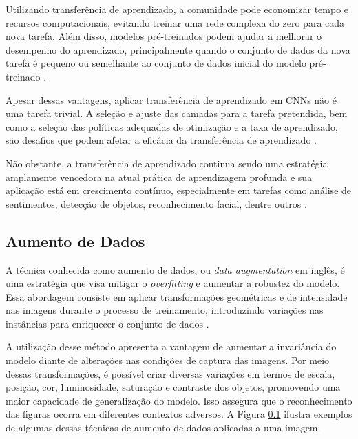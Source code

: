 Utilizando transferência de aprendizado, a comunidade pode economizar tempo e recursos computacionais, evitando treinar uma rede complexa do zero para cada nova tarefa. Além disso, modelos pré-treinados podem ajudar a melhorar o desempenho do aprendizado, principalmente quando o conjunto de dados da nova tarefa é pequeno ou semelhante ao conjunto de dados inicial do modelo pré-treinado \citep{Pan2010}.

Apesar dessas vantagens, aplicar transferência de aprendizado em CNNs não é uma tarefa trivial. A seleção e ajuste das camadas para a tarefa pretendida, bem como a seleção das políticas adequadas de otimização e a taxa de aprendizado, são desafios que podem afetar a eficácia da transferência de aprendizado \citep{Yosinski2014HowNetworks}.

Não obstante, a transferência de aprendizado continua sendo uma estratégia amplamente vencedora na atual prática de aprendizagem profunda e sua aplicação está em crescimento contínuo, especialmente em tarefas como análise de sentimentos, detecção de objetos, reconhecimento facial, dentre outros \citep{Pan2010}.

\subsection{Aumento de Dados}
\label{cnn:augment}

A técnica conhecida como aumento de dados, ou \textit{data augmentation} em inglês, é uma estratégia que visa mitigar o \textit{overfitting} e aumentar a robustez do modelo. Essa abordagem consiste em aplicar transformações geométricas e de intensidade nas imagens durante o processo de treinamento, introduzindo variações nas instâncias para enriquecer o conjunto de dados \citep{Geron2017Hands-onSystems}.

A utilização desse método apresenta a vantagem de aumentar a invariância do modelo diante de alterações nas condições de captura das imagens. Por meio dessas transformações, é possível criar diversas variações em termos de escala, posição, cor, luminosidade, saturação e contraste dos objetos, promovendo uma maior capacidade de generalização do modelo. Isso assegura que o reconhecimento das figuras ocorra em diferentes contextos adversos. A Figura \ref{cnn:augment} ilustra exemplos de algumas dessas técnicas de aumento de dados aplicadas a uma imagem.

